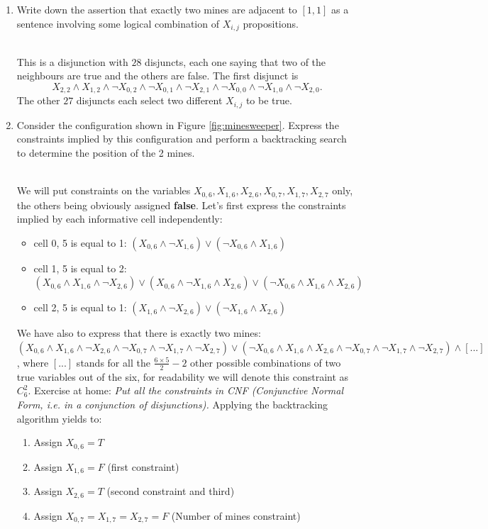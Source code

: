 \documentclass[9pt,a4paper]{extarticle}
\newenvironment{solution}
    {%
    \color{red}
    }
    { 
    \color{black}
    }
\begin{document}
\begin{enumerate}
    \item Write down the assertion that exactly two mines are adjacent to $\left[1,1\right]$ as a sentence involving some logical combination of $X_{i,j}$ propositions.
    \begin{solution}
    \\
    This is a disjunction with $28$ disjuncts, each one saying that two of the neighbours are true and the others are false. The first disjunct is
    $$ X_{2,2} \land X_{1,2} \land \lnot X_{0,2} \land \lnot X_{0,1} \land \lnot X_{2,1} \land \lnot X_{0,0} \land \lnot X_{1,0} \land \lnot X_{2,0}.$$ 
    The other $27$ disjuncts each select two different $X_{i,j}$ to be true.
    \end{solution}
    \item Consider the configuration shown in Figure \ref{fig:minesweeper}. Express the constraints implied by this configuration and perform a backtracking search to determine the position of the 2 mines.
    \begin{solution}
    \\
    We will put constraints on the variables $X_{0,6}, X_{1,6}, X_{2,6}, X_{0,7}, X_{1,7}, X_{2,7}$ only, the others being obviously assigned \textbf{false}.
    Let's first express the constraints implied by each informative cell independently:
    \begin{itemize}
        \item cell 0, 5 is equal to 1: $(X_{0,6} \land \lnot X_{1,6}) \lor (\lnot X_{0,6} \land X_{1,6})$
        \item cell 1, 5 is equal to 2: $(X_{0,6} \land X_{1,6} \land \lnot X_{2,6}) \lor (X_{0,6} \land \lnot X_{1,6} \land X_{2,6}) \lor (\lnot X_{0,6} \land X_{1,6} \land X_{2,6})$
        \item cell 2, 5 is equal to 1: $(X_{1,6} \land \lnot X_{2,6}) \lor (\lnot X_{1,6} \land X_{2,6})$
    \end{itemize}
    We have also to express that there is exactly two mines: $(X_{0,6} \land X_{1,6} \land \lnot X_{2,6} \land \lnot X_{0,7} \land \lnot X_{1,7} \land \lnot X_{2,7}) \lor (\lnot X_{0,6} \land X_{1,6} \land X_{2,6} \land \lnot X_{0,7} \land \lnot X_{1,7} \land \lnot X_{2,7}) \land \left[...\right]$, where $\left[...\right]$ stands for all the $\frac{6\times5}{2} - 2$ other possible combinations of two true variables out of the six, for readability we will denote this constraint as $C_6^2$.
    Exercise at home: \textit{Put all the constraints in CNF (Conjunctive Normal Form, i.e. in a conjunction of disjunctions).}
    Applying the backtracking algorithm yields to:
    \begin{enumerate}
        \item Assign $X_{0,6} = T$
        \item Assign $X_{1,6} = F$ (first constraint)
        \item Assign $X_{2, 6} = T$ (second constraint and third)
        \item Assign $X_{0, 7} = X_{1, 7} = X_{2, 7} = F$ (Number of mines constraint)
    \end{enumerate}
    \end{solution}
\end{enumerate}
\end{document}
